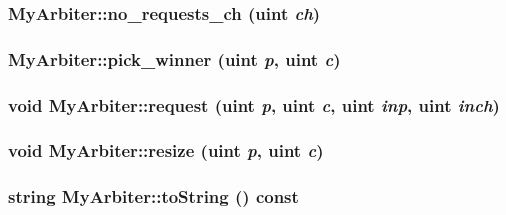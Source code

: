 \hypertarget{classMyArbiter_e4e3428f44129f79fc10c5b0f4cd51f4}{
\subsubsection[{no\_\-requests\_\-ch}]{ MyArbiter::no\_\-requests\_\-ch ({\bf uint} {\em ch})}}
\label{classMyArbiter_e4e3428f44129f79fc10c5b0f4cd51f4}


\hypertarget{classMyArbiter_9ae248e0ec7f01d68b0ca4108f954d77}{
\subsubsection[{pick\_\-winner}]{ MyArbiter::pick\_\-winner ({\bf uint} {\em p}, \/  {\bf uint} {\em c})}}
\label{classMyArbiter_9ae248e0ec7f01d68b0ca4108f954d77}


\hypertarget{classMyArbiter_565ff83b3e9dbca9b2d92cdec6c1f5da}{
\subsubsection[{request}]{\setlength{\rightskip}{0pt plus 5cm}void MyArbiter::request ({\bf uint} {\em p}, \/  {\bf uint} {\em c}, \/  {\bf uint} {\em inp}, \/  {\bf uint} {\em inch})}}
\label{classMyArbiter_565ff83b3e9dbca9b2d92cdec6c1f5da}


\hypertarget{classMyArbiter_a2ae3de19a21c39f6bccf332976d2c81}{
\subsubsection[{resize}]{\setlength{\rightskip}{0pt plus 5cm}void MyArbiter::resize ({\bf uint} {\em p}, \/  {\bf uint} {\em c})}}
\label{classMyArbiter_a2ae3de19a21c39f6bccf332976d2c81}


\hypertarget{classMyArbiter_170c7d52952f17cf6e6a00130b503455}{
\subsubsection[{toString}]{\setlength{\rightskip}{0pt plus 5cm}string MyArbiter::toString () const}}
\label{classMyArbiter_170c7d52952f17cf6e6a00130b503455}





